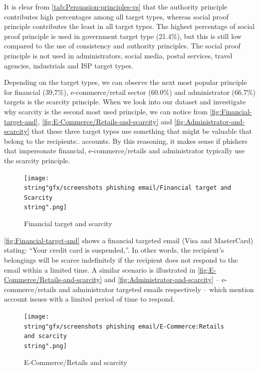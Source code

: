 It is clear from \autoref{tab:Persuasion-principles-vs} that the
authority principle contributes high percentages among all target
types, whereas social proof principle contributes the least in all
target types. The highest percentage of social proof principle is
used in government target type (21.4\%), but this is still low compared
to the use of consistency and authority principles. The social proof
principle is not used in administrators, social media, postal services,
travel agencies, industrials and ISP target types.

Depending on the target types, we can observe the next most popular
principle for financial (39,7\%), e-commerce/retail sector (60.0\%)
and administrator (66.7\%) targets is the scarcity principle. When
we look into our dataset and investigate why scarcity is the second
most used principle, we can notice from \autoref{fig:Financial-target-and},
\autoref{fig:E-Commerce/Retails-and-scarcity} and \autoref{fig:Administrator-and-scarcity}
that these three target types use something that might be valuable
that belong to the recipients:. accounts. By this reasoning, it makes
sense if phishers that impersonate financial, e-commerce/retails and
administrator typically use the scarcity principle.

\begin{figure}[H]
\texttt{[image: \\string"gfx/screenshots phishing email/Financial target and Scarcity\\string".png]}\protect\caption{\label{fig:Financial-target-and}Financial target and scarcity}
\end{figure}


\autoref{fig:Financial-target-and} shows a financial targeted email
(Visa and MasterCard) stating: \textquotedblleft Your credit card
is suspended,\textquotedblright . In other words, the recipient's
belongings will be scarce indefinitely if the recipient does not respond
to the email within a limited time. A similar scenario is illustrated
in \autoref{fig:E-Commerce/Retails-and-scarcity} and \autoref{fig:Administrator-and-scarcity}
-- e-commerce/retails and administrator targeted emails respectively
-- which mention account issues with a limited period of time to respond.

\begin{figure}[H]
\centering{}\texttt{[image: \\string"gfx/screenshots phishing email/E-Commerce:Retails and scarcity\\string".png]}\protect\caption{\label{fig:E-Commerce/Retails-and-scarcity}E-Commerce/Retails and
scarcity}
\end{figure}


